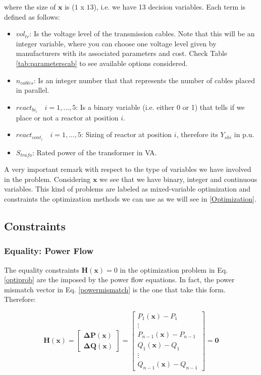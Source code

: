 \documentclass[a4paper,11pt, titlepage, twoside]{article}
\begin{document}
where the size of $\mathbf{x}$ is ($1$ x $13$), i.e. we have 13 decision variables. Each term is defined as follows:
\begin{itemize}
    \item $vol_{tr}$: Is the voltage level of the transmission cables. Note that this will be an integer variable, where you can choose one voltage level
    given by manufacturers with its associated parameters and cost. Check Table \ref{tab:parameterscab} to see available options considered.
    \item $n_{cables}$: Is an integer number that that represents the number of cables placed in parallel.
    \item $react_{bi_i} \quad i=1,...,5$: Is a binary variable (i.e. either 0 or 1) that tells if we place or not a reactor at position $i$.
    \item $react_{cont_i} \quad i=1,...,5$: Sizing of reactor at position $i$, therefore its $Y_{shi}$ in p.u.
    \item $S_{trafo}$: Rated power of the transformer in VA.
\end{itemize}

A very important remark with respect to the type of variables we have involved in the problem. Considering $\mathbf{x}$ we see that we have 
binary, integer and continuous variables. This kind of problems are labeled as mixed-variable optimization and constraints the optimization 
methods we can use as we will see in \ref{Optimization}.


\subsection{Constraints}
\subsubsection{Equality: Power Flow}\label{equality}

The equality constraints $ \mathbf{H(x)} = 0$ in the optimization problem in  Eq. \ref{optiprob} are the imposed by the power flow equations. In fact, the power mismatch vector in Eq. \ref{powermismatch} is the one that take this form. Therefore:

\begin{equation}
    \mathbf{H(x)} = \begin{bmatrix}
    \mathbf{\Delta P(\mathbf{x})} \\
    \mathbf{\Delta Q(\mathbf{x})}
    \end{bmatrix} = \begin{bmatrix}
    P_1(\mathbf{x}) - P_1 \\
    \vdots \\
    P_{n-1}(\mathbf{x}) - P_{n-1} \\
    Q_1(\mathbf{x}) - Q_1 \\
    \vdots \\
    Q_{n-1}(\mathbf{x}) - Q_{n-1}
    \end{bmatrix} = \mathbf{0}
\end{equation}
\end{document}
